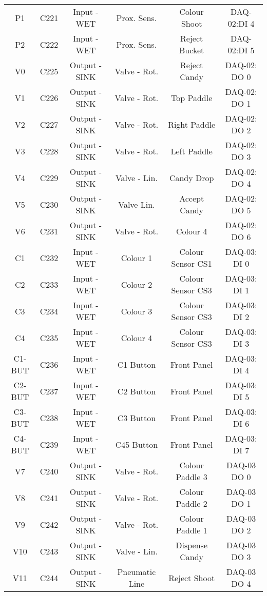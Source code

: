\begin{center}
\begin{longtable}[c]{ |c|c|c|c|c|c| }
        P1	&	C221	&	Input - WET	&	Prox. Sens.	&	Colour Shoot	&	DAQ-02:DI 4\\
        P2	&	C222	&	Input - WET	&	Prox. Sens.	&	Reject Bucket	&	DAQ-02:DI 5\\
        V0	&	C225	&	Output - SINK	&	Valve - Rot.	&	Reject Candy	&	DAQ-02: DO 0\\
        V1	&	C226	&	Output - SINK	&	Valve - Rot.	&	Top Paddle	&	DAQ-02: DO 1\\
        V2	&	C227	&	Output - SINK	&	Valve - Rot.	&	Right Paddle	&	DAQ-02: DO 2\\
        V3	&	C228	&	Output - SINK	&	Valve - Rot.	&	Left Paddle	&	DAQ-02: DO 3\\
        V4	&	C229	&	Output - SINK	&	Valve - Lin.	&	Candy Drop	&	DAQ-02: DO 4\\
        V5	&	C230	&	Output - SINK	&	Valve Lin.	&	Accept Candy	&	DAQ-02: DO 5\\
        V6	&	C231	&	Output - SINK	&	Valve - Rot.	&	Colour 4	&	DAQ-02: DO 6\\
        C1	&	C232	&	Input - WET	&	Colour 1	&	Colour Sensor CS1	&	DAQ-03: DI 0\\
        C2	&	C233	&	Input - WET	&	Colour 2	&	Colour Sensor CS3	&	DAQ-03: DI 1\\
        C3	&	C234	&	Input - WET	&	Colour 3	&	Colour Sensor CS3	&	DAQ-03: DI 2\\
        C4	&	C235	&	Input - WET	&	Colour 4	&	Colour Sensor CS3	&	DAQ-03: DI 3\\
        C1-BUT	&	C236	&	Input - WET	&	C1 Button	&	Front Panel	&	DAQ-03: DI 4\\
        C2-BUT	&	C237	&	Input - WET	&	C2 Button	&	Front Panel	&	DAQ-03: DI 5\\
        C3-BUT	&	C238	&	Input - WET	&	C3 Button	&	Front Panel	&	DAQ-03: DI 6\\
        C4-BUT	&	C239	&	Input - WET	&	C45 Button	&	Front Panel	&	DAQ-03: DI 7\\
        V7	&	C240	&	Output - SINK	&	Valve - Rot.	&	Colour Paddle 3	&	DAQ-03 DO 0\\
        V8	&	C241	&	Output - SINK	&	Valve - Rot.	&	Colour Paddle 2	&	DAQ-03 DO 1\\
        V9	&	C242	&	Output - SINK	&	Valve - Rot.	&	Colour Paddle 1	&	DAQ-03 DO 2\\
        V10	&	C243	&	Output - SINK	&	Valve - Lin.	&	Dispense Candy	&	DAQ-03 DO 3\\
        V11	&	C244	&	Output - SINK	&	Pneumatic Line	&	Reject Shoot	&	DAQ-03 DO 4\\

\end{longtable}
\end{center}
